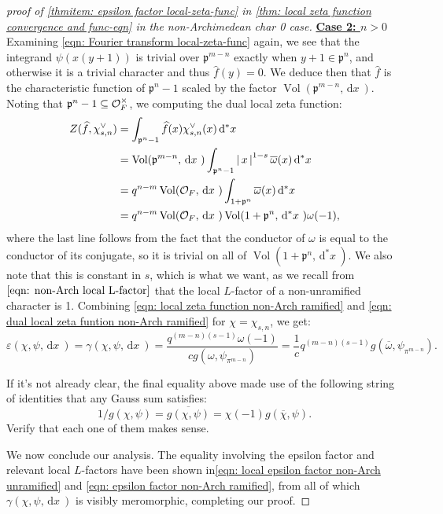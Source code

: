 \documentclass[11pt, x11names, openany]{book}
\newcommand{\pp}{\mathfrak{p}}
\renewcommand{\bar}[1]{\overline{#1}}
\newcommand{\abs}[1]{\left| \, #1  \,\right|}
\renewcommand{\hat}{\widehat}
\newcommand{\dx}{\, \mathrm{d}x \ }
\renewcommand{\d}[1]{\, \mathrm{d}#1 \ }
\DeclareMathOperator{\vol}{Vol}
\begin{document}
\begin{proof}[proof of \ref{thmitem: epsilon factor local-zeta-func} in \ref{thm: local zeta function convergence and func-eqn} in the non-Archimedean char 0 case]
\textbf{\underline{Case 2: $n > 0$}}\\
Examining \ref{eqn: Fourier transform local-zeta-func} again, we see that the integrand $\psi(x(y+1))$ is trivial over $\pp^{m-n}$ exactly when $y + 1 \in \pp^n$, and otherwise it is a trivial character and thus $\hat{f}(y) = 0$. We deduce then that $\hat{f}$ is the characteristic function of $\pp^n - 1$ scaled by the factor $\vol(\pp^{m-n}, \dx)$. Noting that $\pp^n - 1 \subseteq \calo_F^\times$, we computing the dual local zeta function:
\begin{align}
\label{eqn: dual local zeta funtion non-Arch ramified}
    Z(\hat{f}, \chi^\lor_{s, n}) &= \int_{\pp^n - 1} \hat{f}(x) \chi^\lor_{s, n}(x) \d{^*x} \nonumber \\
    &= \vol(\pp^{m-n}, \dx) \int_{\pp^n - 1} \abs{x}^{1-s} \bar{\omega}(x) \d{^*x} \nonumber \\
    &= q^{n-m} \vol(\calo_F, \dx) \int_{1 + \pp^n} \bar{\omega}(x) \d{^*x} \nonumber \\
    &= q^{n-m} \vol(\calo_F, \dx) \vol(1 + \pp^n, \d{^*x}) \omega(-1),
\end{align}
where the last line follows from the fact that the conductor of $\omega$ is equal to the conductor of its conjugate, so it is trivial on all of $\vol(1 + \pp^n, \d{^*x})$. We also note that this is constant in $s$, which is what we want, as we recall from $\ref{eqn: non-Arch local L-factor}$ that the local $L$-factor of a non-unramified character is 1. Combining \ref{eqn: local zeta function non-Arch ramified} and \ref{eqn: dual local zeta funtion non-Arch ramified} for $\chi = \chi_{s, n}$, we get:
\begin{equation}
\label{eqn: epsilon factor non-Arch ramified}
    \varepsilon(\chi, \psi, \dx) = \gamma(\chi, \psi, \dx) = \frac{q^{(m-n)(s-1)} \omega(-1)}{ c g( \omega, \psi_{\pi^{m-n}})} = \frac{1}{c}q^{(m-n)(s-1)}g(\bar{\omega}, \psi_{\pi^{m-n}}).
\end{equation}
\begin{sanitycheck}
    If it's not already clear, the final equality above made use of the following string of identities that any Gauss sum satisfies:
    \begin{equation*}
        1/g(\chi, \psi) = \bar{g(\chi, \psi)} = \chi(-1) g(\bar{\chi}, \psi).
    \end{equation*}
    Verify that each one of them makes sense.
\end{sanitycheck}

We now conclude our analysis. The equality involving the epsilon factor and relevant local $L$-factors have been shown in\ref{eqn: local epsilon factor non-Arch unramified} and \ref{eqn: epsilon factor non-Arch ramified}, from all of which $\gamma(\chi, \psi, \dx)$ is visibly meromorphic, completing our proof.
\end{proof}
\end{document}
